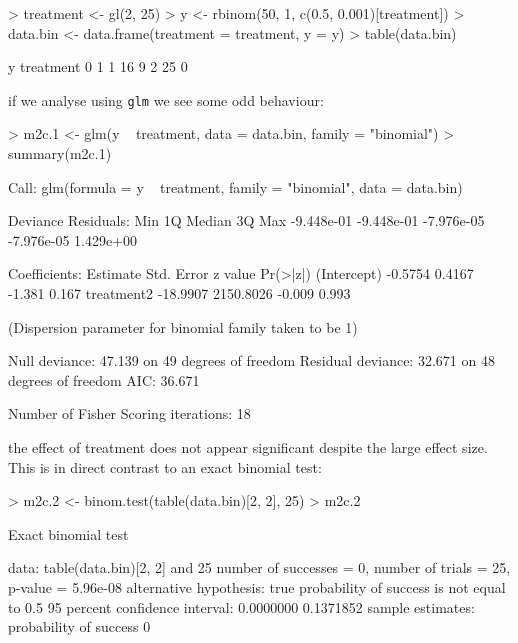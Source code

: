 \documentclass{article}
\begin{document}
\begin{Schunk}
\begin{Sinput}
> treatment <- gl(2, 25)
> y <- rbinom(50, 1, c(0.5, 0.001)[treatment])
> data.bin <- data.frame(treatment = treatment, y = y)
> table(data.bin)
\end{Sinput}
\begin{Soutput}
         y
treatment  0  1
        1 16  9
        2 25  0
\end{Soutput}
\end{Schunk}
 
if we analyse using \texttt{glm} we see some odd behaviour:

\begin{Schunk}
\begin{Sinput}
> m2c.1 <- glm(y ~ treatment, data = data.bin, family = "binomial")
> summary(m2c.1)
\end{Sinput}
\begin{Soutput}
Call:
glm(formula = y ~ treatment, family = "binomial", data = data.bin)

Deviance Residuals: 
       Min          1Q      Median          3Q         Max  
-9.448e-01  -9.448e-01  -7.976e-05  -7.976e-05   1.429e+00  

Coefficients:
             Estimate Std. Error z value Pr(>|z|)
(Intercept)   -0.5754     0.4167  -1.381    0.167
treatment2   -18.9907  2150.8026  -0.009    0.993

(Dispersion parameter for binomial family taken to be 1)

    Null deviance: 47.139  on 49  degrees of freedom
Residual deviance: 32.671  on 48  degrees of freedom
AIC: 36.671

Number of Fisher Scoring iterations: 18
\end{Soutput}
\end{Schunk}

the effect of treatment does not appear significant despite the large effect size. This is in direct contrast to an exact binomial test: 

\begin{Schunk}
\begin{Sinput}
> m2c.2 <- binom.test(table(data.bin)[2, 2], 25)
> m2c.2
\end{Sinput}
\begin{Soutput}
	Exact binomial test

data:  table(data.bin)[2, 2] and 25 
number of successes = 0, number of trials = 25, p-value = 5.96e-08
alternative hypothesis: true probability of success is not equal to 0.5 
95 percent confidence interval:
 0.0000000 0.1371852 
sample estimates:
probability of success 
                     0 
\end{Soutput}
\end{Schunk}
\end{document}
